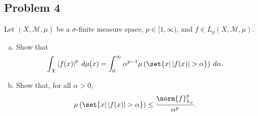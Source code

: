 \documentclass[10pt]{mypackage}
\begin{document}
\subsection{Problem 4}%
\begin{problem}
  Let $\left( X,\mathcal{M},\mu \right)$ be a $\sigma$-finite measure space, $p\in [1,\infty)$, and $f\in L_p\left( X,\mathcal{M},\mu \right)$.
  \begin{enumerate}[(a)]
    \item Show that
      \begin{align*}
        \int_{X}^{} \left\vert f(x) \right\vert^{p}\:d\mu(x) &= \int_{0}^{\infty} \alpha^{p-1} \mu\left( \set{x | \left\vert f(x) \right\vert > \alpha} \right)\:d\alpha.
      \end{align*}
    \item Show that, for all $\alpha > 0$,
      \begin{align*}
        \mu\left( \set{x | \left\vert f(x) \right\vert > \alpha} \right) &\leq \frac{\norm{f}_{L_p}^{p}}{\alpha^{p}}.
      \end{align*}
  \end{enumerate}
\end{problem}
\end{document}
